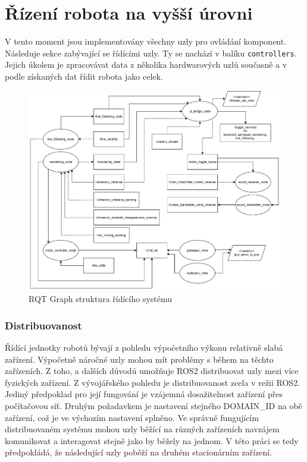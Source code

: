 \section{Řízení robota na vyšší úrovni}
V tento moment jsou implementovány všechny uzly pro ovládání komponent. Následuje sekce zabývající se řídícími uzly. Ty se nachází v balíku \verb|controllers|. Jejich úkolem je zpracovávat data z několika hardwarových uzlů současně a v podle získaných dat řídit robota jako celek.

\begin{figure}[h!]
	\centering
	\includegraphics[scale=0.5]{obrazky-figures/controller_nodes.pdf}
	\caption{RQT Graph struktura řídícího systému}
	\label{}
\end{figure}

\subsubsection{Distribuovanost}
Řídící jednotky robotů bývají z pohledu výpočetního výkonu relativně slabá zařízení. Výpočetně náročné uzly mohou mít problémy s během na těchto zařízeních. Z toho, a dalších důvodů umožňuje ROS2 distribuovat uzly mezi více fyzických zařízení. Z vývojářského pohledu je distribuovanost zcela v režii ROS2. Jediný předpoklad pro její fungování je vzájemná dosažitelnost zařízení přes počítačovou síť. Druhým požadavkem je nastavení stejného DOMAIN\_ID na obě zařízení, což je ve výchozím nastavení splněno. Ve správně fungujícím distribuovaném systému mohou uzly běžící na různých zařízeních navzájem komunikovat a interagovat stejně jako by běžely na jednom. V této práci se tedy předpokládá, že následující uzly poběží na druhém stacionárním zařízení. 

